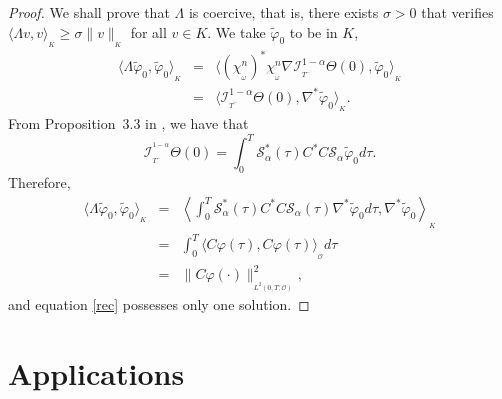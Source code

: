 \documentclass{article}
\begin{document}
\begin{proof}
We shall prove that $\Lambda$ is coercive, that is, 
there exists $\sigma>0$ that verifies $\langle\Lambda v,v\rangle_{_K} 
\geq \sigma\|v\|_{_K}$ for all $v\in K$.
We take $\tilde{\varphi}_0$ to be in $K$,  
\begin{equation*}
\begin{array}{lll}
\langle \Lambda \tilde{\varphi}_0,\tilde{\varphi}_0\rangle_{_K} 
&=& \langle (\chi_{_\omega}^{n})^*\chi_{_\omega}^{n}
\nabla\mathcal{I}_{_{T^-}}^{1-\alpha}
\Theta(0),\tilde{\varphi}_0\rangle_{_K}\\
&=& \langle \mathcal{I}_{_{T^-}}^{1-\alpha}\Theta(0),
\nabla^*\tilde{\varphi}_0\rangle_{_K}.
\end{array}
\end{equation*}
From Proposition~3.3 in \cite{zguaid.2021}, we have that 
$$
\mathcal{I}_{_{T^-}}^{^{1-\alpha}}\Theta(0) 
= \displaystyle\int_{0}^{T}\mathcal{S}_\alpha^*(\tau)
C^*C\mathcal{S}_\alpha\tilde{\varphi}_0 d\tau.
$$
Therefore,
\begin{equation}
\label{prf.th}
\begin{array}{lll}
\langle \Lambda \tilde{\varphi}_0,\tilde{\varphi}_0\rangle_{_K} 
&=& \left\langle \displaystyle\int_{0}^{T}\mathcal{S}_\alpha^*(\tau)
C^*C\mathcal{S}_\alpha(\tau)\nabla^*\tilde{\varphi}_0 d\tau,
\nabla^*\tilde{\varphi}_0\right\rangle_{_K}\\
&=& \displaystyle\int_{0}^{T}\langle C\varphi(\tau),
C\varphi(\tau)\rangle_{_\mathcal{O}} d\tau\\
&=& \|C\varphi(\cdot)\|_{_{L^2(0,T;\mathcal{O})}}^2,
\end{array}
\end{equation}
and equation \eqref{rec} possesses only one solution.
\end{proof}


\section{Applications}
\label{sec:6}
\end{document}
